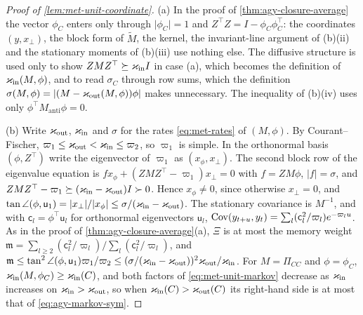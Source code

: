 \begin{proof}[Proof of \cref{lem:met-unit-coordinate}]
(a) In the proof of \cref{thm:agy-closure-average} the vector $\phi_C$ enters only through $\lvert\phi_C\rvert=1$ and $Z^\top Z=I-\phi_C\phi_C^\top$: the coordinates $(y,x_\perp)$, the block form of $\tilde M$, the kernel, the invariant-line argument of (b)(ii) and the stationary moments of (b)(iii) use nothing else. The diffusive structure is used only to show $ZMZ^\top\succeq\varkappa_{\mathrm{in}} I$ in case (a), which becomes the definition of $\varkappa_{\mathrm{in}}(M,\phi)$, and to read $\sigma_C$ through row sums, which the definition $\sigma(M,\phi)=\lvert(M-\varkappa_{\mathrm{out}}(M,\phi))\phi\rvert$ makes unnecessary. The inequality of (b)(iv) uses only $\phi^\top M_{\mathrm{anti}}\phi=0$.

(b) Write $\varkappa_{\mathrm{out}}$, $\varkappa_{\mathrm{in}}$ and $\sigma$ for the rates \eqref{eq:met-rates} of $(M,\phi)$. By Courant--Fischer, $\varpi_1\le\varkappa_{\mathrm{out}}<\varkappa_{\mathrm{in}}\le\varpi_2$, so $\varpi_1$ is simple. In the orthonormal basis $(\phi,Z^\top)$ write the eigenvector of $\varpi_1$ as $(x_\phi,x_\perp)$. The second block row of the eigenvalue equation is $fx_\phi+(ZMZ^\top-\varpi_1)x_\perp=0$ with $f=ZM\phi$, $\lvert f\rvert=\sigma$, and $ZMZ^\top-\varpi_1\succeq(\varkappa_{\mathrm{in}}-\varkappa_{\mathrm{out}})I\succ0$. Hence $x_\phi\neq0$, since otherwise $x_\perp=0$, and $\tan\angle(\phi,\mathsf u_1)=\lvert x_\perp\rvert/\lvert x_\phi\rvert\le\sigma/(\varkappa_{\mathrm{in}}-\varkappa_{\mathrm{out}})$. The stationary covariance is $M^{-1}$, and with $\mathsf c_l=\phi^\top\mathsf u_l$ for orthonormal eigenvectors $\mathsf u_l$, $\operatorname{Cov}(y_{t+u},y_t)=\sum_l(\mathsf c_l^2/\varpi_l)e^{-\varpi_lu}$. As in the proof of \cref{thm:agy-closure-average}(a), $\Xi$ is at most the memory weight $\mathfrak m=\sum_{l\ge2}(\mathsf c_l^2/\varpi_l)/\sum_l(\mathsf c_l^2/\varpi_l)$, and $\mathfrak m\le\tan^2\angle(\phi,\mathsf u_1)\varpi_1/\varpi_2\le(\sigma/(\varkappa_{\mathrm{in}}-\varkappa_{\mathrm{out}}))^2\varkappa_{\mathrm{out}}/\varkappa_{\mathrm{in}}$. For $M=\Pi_{CC}$ and $\phi=\phi_C$, $\varkappa_{\mathrm{in}}(M,\phi_C)\ge\varkappa_{\mathrm{in}}(C)$, and both factors of \eqref{eq:met-unit-markov} decrease as $\varkappa_{\mathrm{in}}$ increases on $\varkappa_{\mathrm{in}}>\varkappa_{\mathrm{out}}$, so when $\varkappa_{\mathrm{in}}(C)>\varkappa_{\mathrm{out}}(C)$ its right-hand side is at most that of \eqref{eq:agy-markov-sym}.
\end{proof}

